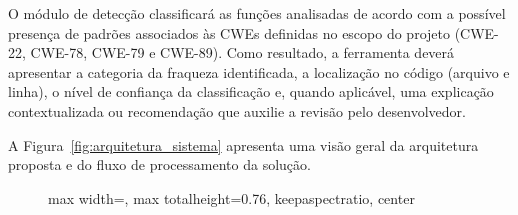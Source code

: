 O módulo de detecção classificará as funções analisadas de acordo com a
possível presença de padrões associados às CWEs definidas no escopo do
projeto (CWE-22, CWE-78, CWE-79 e CWE-89). Como resultado, a ferramenta deverá apresentar a categoria da
fraqueza identificada, a localização no código (arquivo e linha), o
nível de confiança da classificação e, quando aplicável, uma explicação contextualizada ou
recomendação que auxilie a revisão pelo desenvolvedor.

A Figura~\ref{fig:arquitetura_sistema} apresenta uma visão geral da
arquitetura proposta e do fluxo de processamento da solução.

\begin{figure}[H]
    \centering

    \begin{adjustbox}{
        max width=\textwidth,
        max totalheight=0.76\textheight,
        keepaspectratio,
        center
    }
\end{adjustbox}
\end{figure}
